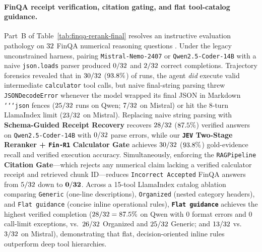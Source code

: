 \paragraph{FinQA receipt verification, citation gating, and flat tool-catalog guidance.}
Part~B of Table~\ref{tab:finqa-rerank-final} resolves an instructive evaluation pathology on $32$ FinQA numerical reasoning questions \citep{chen2021finqa}. Under the legacy unconstrained harness, pairing \texttt{Mistral-Nemo-2407} or \texttt{Qwen2.5-Coder-14B} with a naive \texttt{json.loads} parser produced $0/32$ and $2/32$ correct completions. Trajectory forensics revealed that in $30/32$ ($93.8\%$) of runs, the agent \emph{did} execute valid intermediate \texttt{calculator} tool calls, but naive final-string parsing threw \texttt{JSONDecodeError} whenever the model wrapped its final JSON in Markdown \texttt{`{}`{}`{}json} fences ($25/32$ runs on Qwen; $7/32$ on Mistral) or hit the 8-turn LlamaIndex limit ($23/32$ on Mistral). Replacing naive string parsing with \textbf{Schema-Guided Receipt Recovery} recovers $28/32$ ($87.5\%$) verified answers on \texttt{Qwen2.5-Coder-14B} with $0/32$ parse errors, while our \textbf{\texttt{JEV} Two-Stage Reranker + \texttt{Fin-R1} Calculator Gate} achieves $30/32$ ($93.8\%$) gold-evidence recall and verified execution accuracy. Simultaneously, enforcing the \texttt{RAGPipeline} \textbf{Citation Gate}---which rejects any numerical claim lacking a verified calculator receipt and retrieved chunk ID---reduces \texttt{Incorrect Accepted} FinQA answers from $5/32$ down to $\mathbf{0/32}$. Across a 15-tool LlamaIndex catalog ablation comparing \texttt{Generic} (one-line descriptions), \texttt{Organized} (nested category headers), and \texttt{Flat guidance} (concise inline operational rules), \textbf{\texttt{Flat guidance}} achieves the highest verified completion ($28/32 = 87.5\%$ on Qwen with $0$ format errors and $0$ call-limit exceptions, vs.\ $26/32$ Organized and $25/32$ Generic; and $13/32$ vs.\ $3/32$ on Mistral), demonstrating that flat, decision-oriented inline rules outperform deep tool hierarchies.

